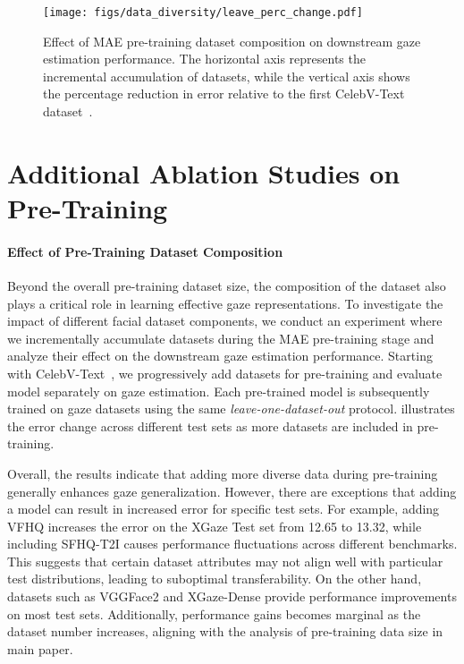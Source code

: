 \begin{figure}[t]
  \centering
    \texttt{[image: figs/data\_diversity/leave\_perc\_change.pdf]}
  \caption{
        Effect of MAE pre-training dataset composition on downstream gaze estimation performance.  
        The horizontal axis represents the incremental accumulation of datasets, while the vertical axis shows the percentage reduction in error relative to the first CelebV-Text dataset~\cite{yu2023celebv}.
    }
  \label{fig:plot_err_vs_data_composition}
\end{figure}


\section{Additional Ablation Studies on Pre-Training}


\paragraph{Effect of Pre-Training Dataset Composition}


Beyond the overall pre-training dataset size, the composition of the dataset also plays a critical role in learning effective gaze representations.
To investigate the impact of different facial dataset components, we conduct an experiment where we incrementally accumulate datasets during the MAE pre-training stage and analyze their effect on the downstream gaze estimation performance.
Starting with CelebV-Text~\cite{yu2023celebv}, we progressively add datasets for pre-training and evaluate model separately on gaze estimation.
Each pre-trained model is subsequently trained on gaze datasets using the same \textit{leave-one-dataset-out} protocol.
 illustrates the error change across different test sets as more datasets are included in pre-training.



Overall, the results indicate that adding more diverse data during pre-training generally enhances gaze generalization.
However, there are exceptions that adding a model can result in increased error for specific test sets.
For example, adding VFHQ increases the error on the XGaze Test set from 12.65 to 13.32, while including SFHQ-T2I causes performance fluctuations across different benchmarks.
This suggests that certain dataset attributes may not align well with particular test distributions, leading to suboptimal transferability.
On the other hand, datasets such as VGGFace2 and XGaze-Dense provide performance improvements on most test sets.
Additionally, performance gains becomes marginal as the dataset number increases, aligning with the analysis of pre-training data size in main paper.


